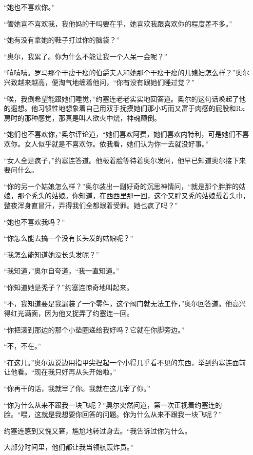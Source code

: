     “她也不喜欢你。”

    “管她喜不喜欢我，我他妈的干吗要在乎，她喜欢我跟喜欢你的程度差不多。”

    “她有没有拿她的鞋子打过你的脑袋？”

    “奥尔，我累了。你为什么不能让我一个人呆一会呢？”

    “嘻嘻嘻。罗马那个干瘦干瘦的伯爵夫人和她那个干瘦干瘦的儿媳妇怎么样？”奥尔兴致越来越高，便淘气地缠着他问，“你有没有跟她们睡过觉？”

    “唉，我倒希望能跟她们睡觉，”约塞连老老实实地回答道。奥尔的这句话唤起了他的遐想。他习惯性地想象着自己用双手抚摸她们那小巧而又富于肉感的屁股和Rx房时的那种感觉，那真是叫人欲火中烧，神魂颠倒。

    “她们也不喜欢你，”奥尔评论道，“她们喜欢阿费，她们喜欢内特利，可是她们不喜欢你。女人似乎就是不喜欢你。依我看，她们认为你一去就没好事。”

    “女人全是疯子，”约塞连答道。他板着脸等待着奥尔发问，他早已知道奥尔接下来要问什么。

    “你的另一个姑娘怎么样？”奥尔装出一副好奇的沉思神情问，“就是那个胖胖的姑娘，那个秃头的姑娘。你知道，在西西里那一回，这个又胖又秃的姑娘戴着头巾，整夜浑身直冒汗，弄得我们全都跟着受罪。她也疯了吗？”

    “她也不喜欢我吗？”

    “你怎么能去搞一个没有长头发的姑娘呢？”

    “我怎么能知道她没长头发呢？”

    “我知道，”奥尔自夸道，“我一直知道。”

    “你知道她是秃子？”约塞连惊奇地叫起来。

    “不，我知道要是我漏装了一个零件，这个阀门就无法工作，”奥尔回答道。他高兴得红光满面，因为他又捉弄了约塞连一回。

    “你把滚到那边的那个小垫圈递给我好吗？它就在你脚旁边。”

    “不，不在。”

    “在这儿。”奥尔边说边用指甲尖捏起一个小得几乎看不见的东西，举到约塞连面前让他看。“现在我只好再从头开始啦。”

    “你再干的话，我就宰了你。我就在这儿宰了你。”

    “你为什么从来不跟我一块飞呢？”奥尔突然问道，第一次正视着约塞连的脸。“喂，这就是我想要你回答的问题。你为什么从来不跟我一块飞呢？”

    约塞连感到又愧又窘，尴尬地转过身去。“我告诉过你为什么。

    大部分时间里，他们都让我当领航轰炸员。”

